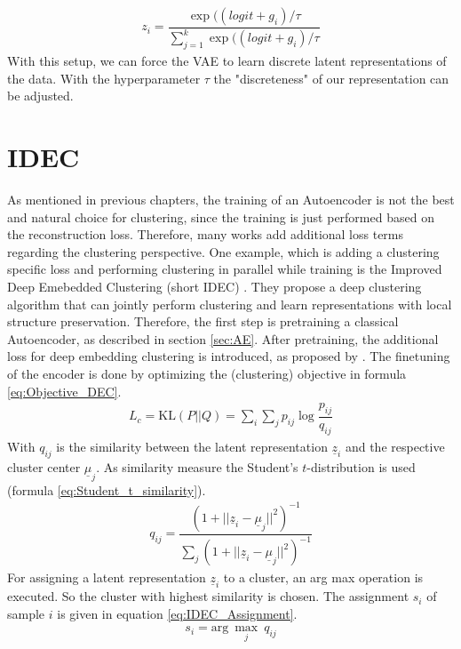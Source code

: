 \documentclass[12pt,DIV14,BCOR12mm,a4paper,footexclude,headinclude,halfparskip-,twoside,openright,cleardoubleempty,idxtotoc,bibtotoc,listtotoc]{scrreprt} %
\numberwithin{equation}{chapter}
\begin{document}
\begin{align}
	z_i = \dfrac{\exp((logit+g_i)/\tau}{\sum_{j=1}^{k}\exp((logit+g_i)/\tau}\label{eq:VAE_GumbelSoftmaxSample}
\end{align}
With this setup, we can force the VAE to learn discrete latent representations of the data. With the hyperparameter $\tau$ the "discreteness" of our representation can be adjusted.
\section{IDEC}
As mentioned in previous chapters, the training of an Autoencoder is not the best and natural choice for clustering, since the training is just performed based on the reconstruction loss. Therefore, many works add additional loss terms regarding the clustering perspective. One example, which is adding a clustering specific loss and performing clustering in parallel while training is the Improved Deep Emebedded Clustering (short IDEC) \cite{Guo17IDEC}. They propose a deep clustering algorithm that can jointly perform clustering and learn representations with local structure preservation. Therefore, the first step is pretraining a classical Autoencoder, as described in section \ref{sec:AE}. After pretraining, the additional loss for deep embedding clustering is introduced, as proposed by \cite{Xie16DEC}. The finetuning of the encoder is done by optimizing the (clustering) objective in formula \ref{eq:Objective_DEC}.
\begin{align}
	L_c = \textrm{KL}(P||Q) = \sum_i\sum_j p_{ij}\log\dfrac{p_{ij}}{q_{ij}}\label{eq:Objective_DEC}
\end{align}
With $q_{ij}$ is the similarity between the latent representation $\underline{z}_i$ and the respective cluster center $\underline{\mu}_j$. As similarity measure the Student's $t$-distribution is used \cite{t-SNE} (formula \ref{eq:Student_t_similarity}).
\begin{align}
	q_{ij}=\dfrac{(1+||\underline{z}_i-\underline{\mu}_j||^2)^{-1}}{\sum_j(1+||\underline{z}_i-\underline{\mu}_j||^2)^{-1}}\label{eq:Student_t_similarity}
\end{align}
For assigning a latent representation $\underline{z}_i$ to a cluster, an arg max operation is executed. So the cluster with highest similarity is chosen. The assignment $s_i$ of sample $i$ is given in equation \ref{eq:IDEC_Assignment}.
\begin{align}
	s_i = \textrm{arg}\ \underset{j}\max\ q_{ij}\label{eq:IDEC_Assignment}
\end{align}
\end{document}
